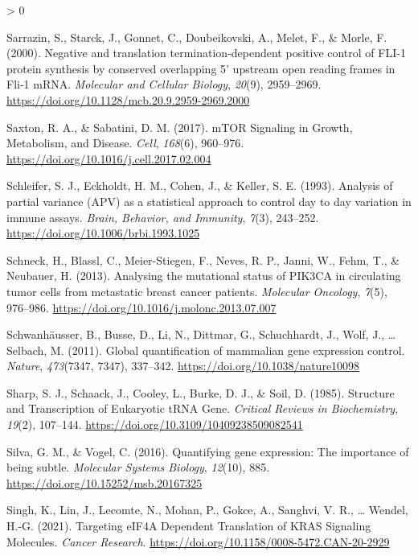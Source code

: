 \documentclass[
  12pt,
  openany]{book}
\newlength{\cslhangindent}
\newenvironment{CSLReferences}[2] %
 {%
  \setlength{\parindent}{0pt}
  \ifodd #1 \everypar{\setlength{\hangindent}{\cslhangindent}}\ignorespaces\fi
  \ifnum #2 > 0
  \setlength{\parskip}{#2\baselineskip}
  \fi
 }%
 {}
\begin{document}
\begin{CSLReferences}{1}{0}
\leavevmode\hypertarget{ref-Sarrazin2000}{}%
Sarrazin, S., Starck, J., Gonnet, C., Doubeikovski, A., Melet, F., \& Morle, F. (2000). Negative and translation termination-dependent positive control of {FLI}-1 protein synthesis by conserved overlapping 5' upstream open reading frames in {Fli}-1 {mRNA}. \emph{Molecular and Cellular Biology}, \emph{20}(9), 2959--2969. \url{https://doi.org/10.1128/mcb.20.9.2959-2969.2000}

\leavevmode\hypertarget{ref-Saxton2017}{}%
Saxton, R. A., \& Sabatini, D. M. (2017). {mTOR Signaling} in {Growth}, {Metabolism}, and {Disease}. \emph{Cell}, \emph{168}(6), 960--976. \url{https://doi.org/10.1016/j.cell.2017.02.004}

\leavevmode\hypertarget{ref-Schleifer1993}{}%
Schleifer, S. J., Eckholdt, H. M., Cohen, J., \& Keller, S. E. (1993). Analysis of partial variance ({APV}) as a statistical approach to control day to day variation in immune assays. \emph{Brain, Behavior, and Immunity}, \emph{7}(3), 243--252. \url{https://doi.org/10.1006/brbi.1993.1025}

\leavevmode\hypertarget{ref-Schneck2013}{}%
Schneck, H., Blassl, C., Meier-Stiegen, F., Neves, R. P., Janni, W., Fehm, T., \& Neubauer, H. (2013). Analysing the mutational status of {PIK3CA} in circulating tumor cells from metastatic breast cancer patients. \emph{Molecular Oncology}, \emph{7}(5), 976--986. \url{https://doi.org/10.1016/j.molonc.2013.07.007}

\leavevmode\hypertarget{ref-Schwanhausser2011}{}%
Schwanhäusser, B., Busse, D., Li, N., Dittmar, G., Schuchhardt, J., Wolf, J., \ldots{} Selbach, M. (2011). Global quantification of mammalian gene expression control. \emph{Nature}, \emph{473}(7347, 7347), 337--342. \url{https://doi.org/10.1038/nature10098}

\leavevmode\hypertarget{ref-Sharp1985}{}%
Sharp, S. J., Schaack, J., Cooley, L., Burke, D. J., \& Soil, D. (1985). Structure and {Transcription} of {Eukaryotic tRNA Gene}. \emph{Critical Reviews in Biochemistry}, \emph{19}(2), 107--144. \url{https://doi.org/10.3109/10409238509082541}

\leavevmode\hypertarget{ref-Silva2016}{}%
Silva, G. M., \& Vogel, C. (2016). Quantifying gene expression: The importance of being subtle. \emph{Molecular Systems Biology}, \emph{12}(10), 885. \url{https://doi.org/10.15252/msb.20167325}

\leavevmode\hypertarget{ref-Singh2021}{}%
Singh, K., Lin, J., Lecomte, N., Mohan, P., Gokce, A., Sanghvi, V. R., \ldots{} Wendel, H.-G. (2021). Targeting {eIF4A Dependent Translation} of {KRAS Signaling Molecules}. \emph{Cancer Research}. \url{https://doi.org/10.1158/0008-5472.CAN-20-2929}


\end{CSLReferences}
\end{document}
